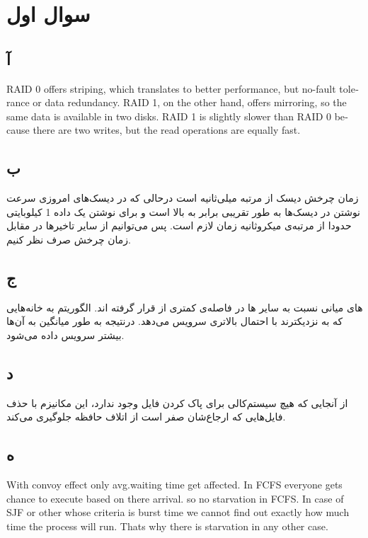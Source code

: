 \documentclass{article}
\begin{document}


\tableofcontents
\newpage

\section{سوال اول}

\subsection{آ}
\begin{latin}
RAID 0 offers striping, which translates to better performance, but no-fault tolerance or data redundancy. RAID 1, on the other hand, offers mirroring, so the same data is available in two disks. RAID 1 is slightly slower than RAID 0 because there are two writes, but the read operations are equally fast.
\end{latin}

\subsection{ب}
زمان چرخش دیسک از مرتبه میلی‌ثانیه است درحالی که در دیسک‌های امروزی سرعت نوشتن در دیسک‌ها به طور تقریبی برابر  به بالا است و برای نوشتن یک داده 1 کیلوبایتی حدودا از مرتبه‌ی میکروثانیه زمان لازم است. پس می‌توانیم از سایر تاخیرها در مقابل زمان چرخش صرف نظر کنیم.

\subsection{ج}
های میانی نسبت به سایر ها در فاصله‌ی کمتری از  قرار گرفته اند. الگوریتم  به خانه‌هایی که به  نزدیکترند با احتمال بالاتری سرویس می‌دهد. درنتیجه به طور میانگین به آن‌ها بیشتر سرویس داده می‌شود.

\subsection{د}
از آنجایی که هیچ سیستم‌کالی برای پاک کردن فایل وجود ندارد، این مکانیزم با حذف فایل‌هایی که ارجاع‌شان صفر است از اتلاف حافظه جلوگیری می‌کند.
 
\subsection{ه}
\begin{latin}
With convoy effect only avg.waiting time get affected. In FCFS everyone gets chance to execute based on there arrival.  so no starvation in FCFS.
In case of SJF or other whose criteria is burst time we cannot find out exactly how much time the process will run. Thats why there is starvation in any other case.
\end{latin}
\end{document}
